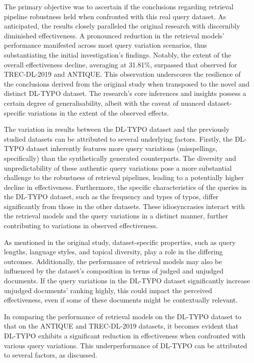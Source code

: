 The primary objective was to ascertain if the conclusions regarding retrieval pipeline robustness held when confronted with this real query dataset. As anticipated, the results closely paralleled the original research with discernibly diminished effectiveness. A pronounced reduction in the retrieval models' performance manifested across most query variation scenarios, thus substantiating the initial investigation's findings. Notably, the extent of the overall effectiveness decline, averaging at 31.81\%, surpassed that observed for TREC-DL-2019 and ANTIQUE. This observation underscores the resilience of the conclusions derived from the original study when transposed to the novel and distinct DL-TYPO dataset. The research's core inferences and insights possess a certain degree of generalisability, albeit with the caveat of nuanced dataset-specific variations in the extent of the observed effects.

The variation in results between the DL-TYPO dataset and the previously studied datasets can be attributed to several underlying factors. Firstly, the DL-TYPO dataset inherently features more query variations (misspellings, specifically) than the synthetically generated counterparts. The diversity and unpredictability of these authentic query variations pose a more substantial challenge to the robustness of retrieval pipelines, leading to a potentially higher decline in effectiveness. Furthermore, the specific characteristics of the queries in the DL-TYPO dataset, such as the frequency and types of typos, differ significantly from those in the other datasets. These idiosyncrasies interact with the retrieval models and the query variations in a distinct manner, further contributing to variations in observed effectiveness.

As mentioned in the original study, dataset-specific properties, such as query lengths, language styles, and topical diversity, play a role in the differing outcomes. Additionally, the performance of retrieval models may also be influenced by the dataset's composition in terms of judged and unjudged documents. If the query variations in the DL-TYPO dataset significantly increase unjudged documents' ranking highly, this could impact the perceived effectiveness, even if some of these documents might be contextually relevant.

In comparing the performance of retrieval models on the DL-TYPO dataset to that on the ANTIQUE and TREC-DL-2019 datasets, it becomes evident that DL-TYPO exhibits a significant reduction in effectiveness when confronted with various query variations. This underperformance of DL-TYPO can be attributed to several factors, as discussed. 


